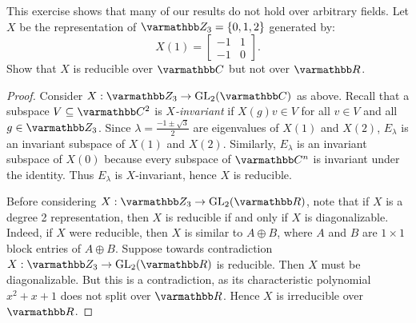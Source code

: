 \begin{exercise}
	
\end{exercise}

\begin{exercise}
	
\end{exercise}

\begin{exercise}
	This exercise shows that many of our results do not hold over arbitrary fields. Let $X$ be the representation of $\bfZ_3 = \{0,1,2\}$ generated by:
	\[
		X(1) = \begin{bmatrix} -1 & 1 \\ -1 & 0 \end{bmatrix}. 
	\] 
	Show that $X$ is reducible over $\bfC$ but not over $\bfR$.
\end{exercise}
	\begin{proof}
		Consider $X:\bfZ_3 \rightarrow \GL_2(\bfC)$ as above. Recall that a subspace $V \subseteq \bfC^2$ is \emph{$X$-invariant} if $X(g)v \in V$ for all $v \in V$ and all $g \in \bfZ_3$. Since $\lambda = \frac{-1 \pm \sqrt{3}}{2}$ are eigenvalues of $X(1)$ and $X(2)$, $E_\lambda$ is an invariant subspace of $X(1)$ and $X(2)$. Similarly, $E_\lambda$ is an invariant subspace of $X(0)$ because every subspace of $\bfC^n$ is invariant under the identity. Thus $E_\lambda$ is $X$-invariant, hence $X$ is reducible.

		Before considering $X:\bfZ_3 \rightarrow \GL_2(\bfR)$, note that if $X$ is a degree 2 representation, then $X$ is reducible if and only if $X$ is diagonalizable. Indeed, if $X$ were reducible, then $X$ is similar to $A \oplus B$, where $A$ and $B$ are $1\times 1$ block entries of $A \oplus B$. Suppose towards contradiction $X:\bfZ_3 \rightarrow \GL_2(\bfR)$ is reducible. Then $X$ must be diagonalizable. But this is a contradiction, as its characteristic polynomial $x^2 + x + 1$ does not split over $\bfR$. Hence $X$ is irreducible over $\bfR$.
	\end{proof}

